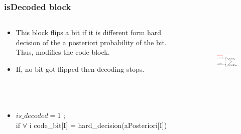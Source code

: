 \documentclass[xcolor=dvipsname]
{beamer}
\begin{document}
\begin{frame}[t]
\frametitle{ isDecoded block }  
\vspace{-5mm}
\begin{columns}[totalwidth=\textwidth]
	\begin{column}{0.48\textwidth}
	\centering
	\begin{itemize}
	\item This block flips a bit if it is different form hard decision 
	of the a posteriori probability of the bit. Thus, modifies the code block.  
	\item If, no bit got flipped then decoding stops.
	\end{itemize}
 
			
	\end{column}%
	   		
	\begin{column}{0.52\textwidth}
	\centering
	\begin{figure}
	\includegraphics[height=3.5cm,width=5cm]{minSum6}
	\end{figure}
	\end{column}%
\end{columns}

\begin{itemize}

\item \alert{$ is\_decoded =  1$ ;\\
if $\forall$ i code\_bit[I] = hard\_decision(aPosteriori[I]) }
\end{itemize}
\end{frame}
\end{document}
